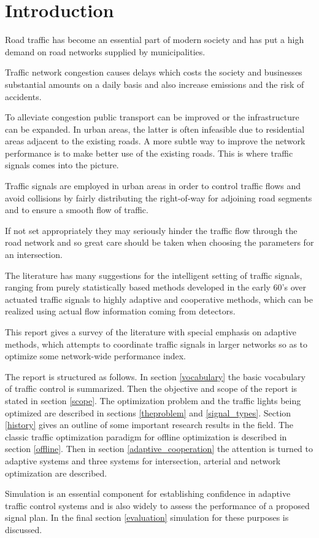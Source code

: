 \section{Introduction}
Road traffic has become an essential part of modern society and has put a high demand on road networks supplied by municipalities. 

Traffic network congestion causes delays which costs the society and businesses substantial amounts on a daily basis and also increase emissions and the risk of accidents.

To alleviate congestion public transport can be improved or the infrastructure can be expanded. In urban areas, the latter is often infeasible due to residential areas adjacent to the existing roads. 
A more subtle way to improve the network performance is to make better use of the existing roads. This is where traffic signals comes into the picture. 

Traffic signals are employed in urban areas in order to control traffic flows and avoid collisions by fairly distributing the right-of-way for adjoining road segments and to ensure a smooth flow of traffic.

If not set appropriately they may seriously hinder the traffic flow through the road network and so great care should be taken when choosing the parameters for an intersection. 

The literature has many suggestions for the intelligent setting of traffic signals, ranging from purely statistically based methods developed in the early 60's over actuated traffic signals to highly adaptive and cooperative methods, which can be realized using actual flow information coming from detectors. 

This report gives a survey of the literature with special emphasis on adaptive methods, which attempts to coordinate traffic signals in larger networks so as to optimize some network-wide performance index. 

The report is structured as follows. In section \ref{vocabulary} the basic vocabulary of traffic control is summarized. Then the objective and scope of the report is stated in section \ref{scope}. 
The optimization problem and the traffic lights being optimized are described in sections \ref{theproblem} and \ref{signal_types}.
Section \ref{history} gives an outline of some important research results in the field. 
The classic traffic optimization paradigm for offline optimization is described in section \ref{offline}.
Then in section \ref{adaptive_cooperation} the attention is turned to adaptive systems and three systems for intersection, arterial and network optimization are described. 

Simulation is an essential component for establishing confidence in adaptive traffic control systems and is also widely to assess the performance of a proposed signal plan. In the final section \ref{evaluation} simulation for these purposes is discussed.
